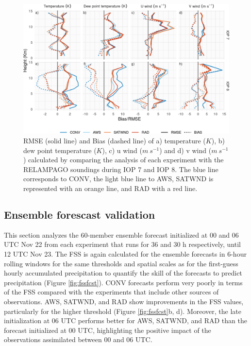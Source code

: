 \documentclass[final,5p,times,twocolumn,authoryear]{elsarticle} %
\begin{document}
\begin{figure}[ht]

{\centering \includegraphics{../figures/soundings-1} 

}

\caption{RMSE (solid line) and Bias (dashed line) of a) temperature (\(K\)), b) dew point temperature (\(K\)), c) u wind (\(m\ s^{-1}\)) and d) v wind (\(m\ s^{-1}\)) calculated by comparing the analysis of each experiment with the RELAMPAGO soundings during IOP 7 and IOP 8. The blue line corresponds to CONV, the light blue line to AWS, SATWND is represented with an orange line, and RAD with a red line.}\label{fig:soundings}
\end{figure}

\hypertarget{ensemble-forescast-validation}{%
\subsection{Ensemble forescast validation}\label{ensemble-forescast-validation}}

This section analyzes the 60-member ensemble forecast initialized at 00 and 06 UTC Nov 22 from each experiment that runs for 36 and 30 h respectively, until 12 UTC Nov 23. The FSS is again calculated for the ensemble forecasts in 6-hour rolling windows for the same thresholds and spatial scales as for the first-guess hourly accumulated precipitation to quantify the skill of the forecasts to predict precipitation (Figure \ref{fig:fssfcst}). CONV forecasts perform very poorly in terms of the FSS compared with the experiments that include other sources of observations. AWS, SATWND, and RAD show improvements in the FSS values, particularly for the higher threshold (Figure \ref{fig:fssfcst}b, d). Moreover, the late initialization at 06 UTC performs better for AWS, SATWND, and RAD than the forecast initialized at 00 UTC, highlighting the positive impact of the observations assimilated between 00 and 06 UTC.
\end{document}
